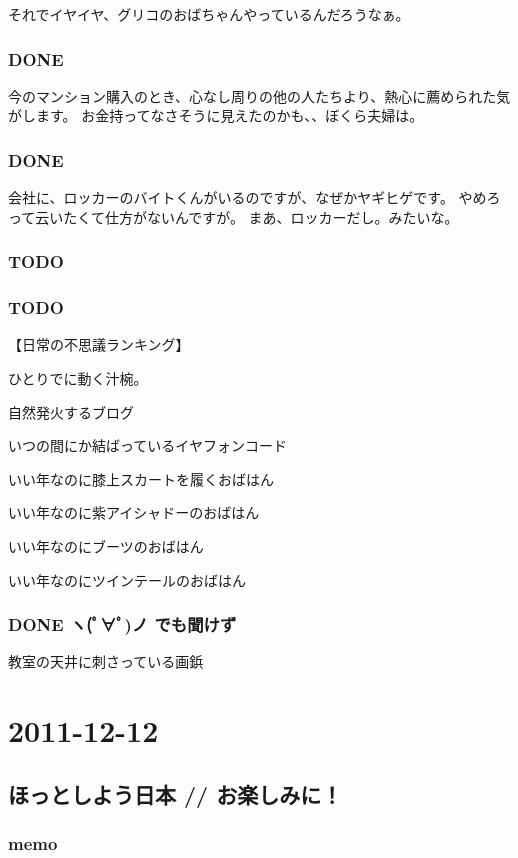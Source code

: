 \documentclass[11pt]{article}
\begin{document}
それでイヤイヤ、グリコのおばちゃんやっているんだろうなぁ。
\subsubsection{\textbf{DONE}}
\label{sec-22_1_4}

今のマンション購入のとき、心なし周りの他の人たちより、熱心に薦められた気がします。
お金持ってなさそうに見えたのかも、、ぼくら夫婦は。
\subsubsection{\textbf{DONE}}
\label{sec-22_1_5}

会社に、ロッカーのバイトくんがいるのですが、なぜかヤギヒゲです。
やめろって云いたくて仕方がないんですが。
まあ、ロッカーだし。みたいな。
\subsubsection{\textbf{TODO}}
\label{sec-22_1_6}
\subsubsection{\textbf{TODO}}
\label{sec-22_1_7}

【日常の不思議ランキング】

ひとりでに動く汁椀。

自然発火するブログ

いつの間にか結ばっているイヤフォンコード

いい年なのに膝上スカートを履くおばはん

いい年なのに紫アイシャドーのおばはん

いい年なのにブーツのおばはん

いい年なのにツインテールのおばはん
\subsubsection{\textbf{DONE} ヽ(ﾟ∀ﾟ)ノ でも聞けず}
\label{sec-22_1_8}

教室の天井に刺さっている画鋲
\section{2011-12-12}
\label{sec-23}
\subsection{ほっとしよう日本 // お楽しみに！}
\label{sec-23_1}
\subsubsection{memo}
\label{sec-23_1_1}
\end{document}
